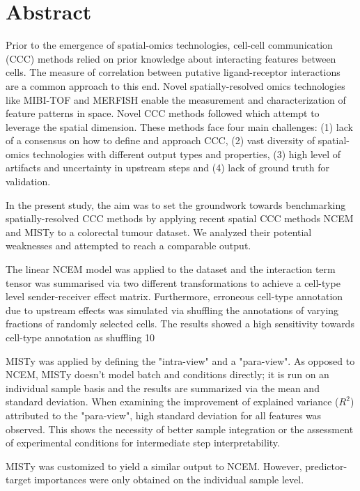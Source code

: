 \chapter*{Abstract}


Prior to the emergence of spatial-omics technologies, cell-cell communication (CCC) methods relied on prior knowledge about interacting features between cells. The measure of correlation between putative ligand-receptor interactions are a common approach to this end. Novel spatially-resolved omics technologies like MIBI-TOF and MERFISH enable the measurement and characterization of feature patterns in space. Novel CCC methods followed which attempt to leverage the spatial dimension. These methods face four main challenges: (1) lack of a consensus on how to define and approach CCC, (2) vast diversity of spatial-omics technologies with different output types and properties, (3) high level of artifacts and uncertainty in upstream steps and (4) lack of ground truth for validation.

In the present study, the aim was to set the groundwork towards benchmarking spatially-resolved CCC methods by applying recent spatial CCC methods NCEM and MISTy to a colorectal tumour dataset. We analyzed their potential weaknesses and attempted to reach a comparable output.

The linear NCEM model was applied to the dataset and the interaction term tensor was summarised via two different transformations to achieve a cell-type level sender-receiver effect matrix. Furthermore, erroneous cell-type annotation due to upstream effects was simulated via shuffling the annotations of varying fractions of randomly selected cells. The results showed a high sensitivity towards cell-type annotation as shuffling 10%

MISTy was applied by defining the "intra-view" and a "para-view". As opposed to NCEM, MISTy doesn't model batch and conditions directly; it is run on an individual sample basis and the results are summarized via the mean and standard deviation. When examining the improvement of explained variance ($R^2$) attributed to the "para-view", high standard deviation for all features was observed. This shows the necessity of better sample integration or the assessment of experimental conditions for intermediate step interpretability.

MISTy was customized to yield a similar output to NCEM. However, predictor-target importances were only obtained on the individual sample level.


\setcounter{page}{1}

